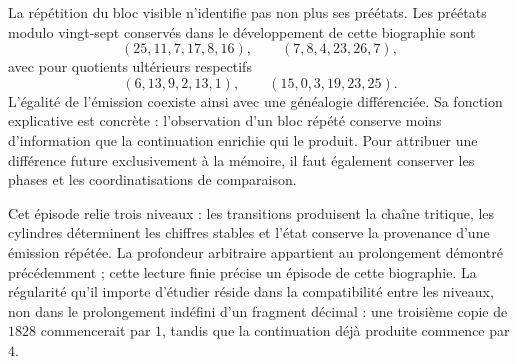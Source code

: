 La répétition du bloc visible n’identifie pas non plus ses préétats.
Les préétats modulo vingt-sept conservés dans le développement de
cette biographie sont
\[
 (25,11,7,17,8,16),\qquad (7,8,4,23,26,7),
\]
avec pour quotients ultérieurs respectifs
\[
 (6,13,9,2,13,1),\qquad (15,0,3,19,23,25).
\]
L’égalité de l’émission coexiste ainsi avec une généalogie différenciée.
Sa fonction explicative est concrète : l’observation d’un bloc
répété conserve moins d’information que la continuation enrichie
qui le produit. Pour attribuer une différence future exclusivement
à la mémoire, il faut également conserver les phases et les coordinatisations de
comparaison.

Cet épisode relie trois niveaux : les transitions produisent la
chaîne tritique, les cylindres déterminent les chiffres stables et
l’état conserve la provenance d’une émission répétée. La
profondeur arbitraire appartient au prolongement démontré
précédemment ; cette lecture finie précise un épisode de cette
biographie. La régularité qu’il importe d’étudier réside dans la
compatibilité entre les niveaux, non dans le prolongement indéfini
d’un fragment décimal : une troisième copie de \(1828\) commencerait par
\(1\), tandis que la continuation déjà produite commence par \(4\).
